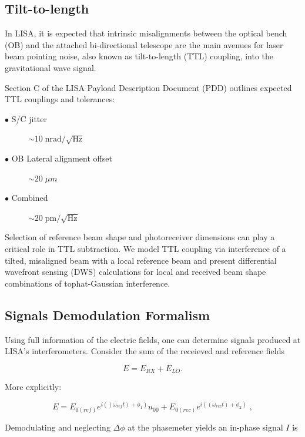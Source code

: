 \documentclass[aps,twoside,secnumarabic,balancelastpage,amsmath,amssymb,nofootinbib,hyperref=pdftex]{revtex4}
\begin{document}
\subsection{Tilt-to-length}
In LISA, it is expected that intrinsic misalignments between the optical bench (OB) and
the attached bi-directional telescope are the main avenues for laser beam pointing noise, also known as tilt-to-length
(TTL) coupling, into the gravitational wave signal.

\medskip

Section C of the LISA Payload Description Document (PDD) outlines expected TTL couplings and tolerances: 

\begin{description}
  \item[$\bullet$ S/C jitter] $ \sim  10\; \text{nrad}/\sqrt{\text{Hz}}$
  \item[$\bullet$ OB Lateral alignment offset] $\sim 20\; \mu m$
  \item[$\bullet$ Combined] $\sim 20\; \text{pm}/\sqrt{\text{Hz}}$
\end{description}

Selection of reference beam shape and photoreceiver dimensions
can play a critical role in TTL subtraction. We model TTL coupling via interference of a tilted, misaligned beam
with a local reference beam and present differential wavefront sensing (DWS) calculations for local and received beam
shape combinations of tophat-Gaussian interference.

\medskip

\subsection{Signals Demodulation Formalism}

Using full information of the electric fields, one can determine signals produced at LISA's interferometers. Consider the sum of the receieved and reference fields 

\begin{equation}
E = E_{RX}+E_{LO}.
\end{equation}

More explicitly: 

\begin{equation}
	E = 
			E_{0(ref)} 
			e^{i(( \omega_{ref} t)+\phi_{1})} 
			u_{00}
			+
			E_{0(rec)}			
			e^{i (( \omega_{rec}t)+\phi_{2})} \; ,
\end{equation}


Demodulating and neglecting $\Delta \phi$ at the phasemeter yields an in-phase signal $I$ is
\end{document}
